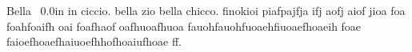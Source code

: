 \documentclass[a4paper,12pt]{dmCV}
\begin{document}
\address{Via Prenestina 226}
\personaldata
\newpage
\hbox {\vrule\hfil Bella \hfil\vrule} 0.0in in ciccio. bella zio
 bella chicco. finokioi piafpajfja ifj aofj aiof jioa foa foahfoaifh
 oai foafhaof oafhuoafhuoa fauohfauohfuoaehfiuoaefhoaeih foae
 faioefhoaefhaiuoefhhofhoaiufhoae ff.\par
{}\par
\end{document}
